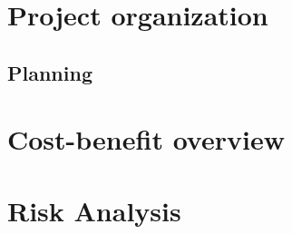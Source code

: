 \documentclass[11pt, a4paper]{report}
\begin{document}
\begin{justify}
\chapter{Project organization}
	

\begin{landscape}
	\chapter{Planning}
		
\end{landscape}

\chapter{Cost-benefit overview}
	

\chapter{Risk Analysis}
	

	\end{justify}
\end{document}
